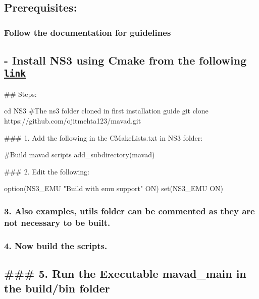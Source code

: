 \subsection*{Prerequisites\+:}

\subsubsection*{Follow the documentation for guidelines}

\subsection*{-\/ Install N\+S3 using Cmake from the following \href{https://github.com/Gabrielcarvfer/NS3}{\tt link} }

\#\# Steps\+: 
\begin{DoxyCode}
cd NS3 #The ns3 folder cloned in first installation guide
git clone https://github.com/ojitmehta123/mavad.git
\end{DoxyCode}
 \#\#\# 1. Add the following in the C\+Make\+Lists.\+txt in N\+S3 folder\+: 
\begin{DoxyCode}
#Build mavad scripts
add\_subdirectory(mavad)
\end{DoxyCode}
 \#\#\# 2. Edit the following\+: 
\begin{DoxyCode}
option(NS3\_EMU "Build with emu support" ON)
set(NS3\_EMU ON)
\end{DoxyCode}


\subsubsection*{3. Also examples, utils folder can be commented as they are not necessary to be built.}

\subsubsection*{4. Now build the scripts.}

\subsection*{\#\#\# 5. Run the Executable mavad\+\_\+main in the build/bin folder }